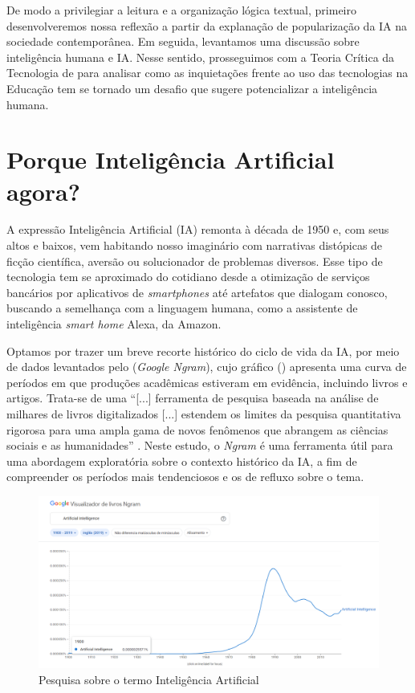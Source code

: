 \documentclass[portuguese]{textolivre}
\begin{document}
De modo a privilegiar a leitura e a organização lógica textual, primeiro desenvolveremos nossa reflexão a partir da explanação de popularização da IA na sociedade contemporânea. Em seguida, levantamos uma discussão sobre inteligência humana e IA. Nesse sentido, prosseguimos com a Teoria Crítica da Tecnologia de \textcite{feenberg2003, feenberg2004} para analisar como as inquietações frente ao uso das tecnologias na Educação tem se tornado um desafio que sugere potencializar a inteligência humana.
 

\section{Porque Inteligência Artificial agora?}

A expressão Inteligência Artificial (IA) remonta à década de 1950 \cite{santaella2023inteligencia} e, com seus altos e baixos, vem habitando nosso imaginário com narrativas distópicas de ficção científica, aversão ou solucionador de problemas diversos. Esse tipo de tecnologia tem se aproximado do cotidiano desde a otimização de serviços bancários por aplicativos de \emph{smartphones} até artefatos que dialogam conosco, buscando a semelhança com a linguagem humana, como a assistente de inteligência \emph{smart home} Alexa, da Amazon.

Optamos por trazer um breve recorte histórico do ciclo de vida da IA, por meio de dados levantados pelo \textcite{google} (\emph{Google Ngram}), cujo gráfico () apresenta uma curva de períodos em que produções acadêmicas estiveram em evidência, incluindo livros e artigos. Trata-se de uma “[...] ferramenta de pesquisa baseada na análise de milhares de livros digitalizados [...] estendem os limites da pesquisa quantitativa rigorosa para uma ampla gama de novos fenômenos que abrangem as ciências sociais e as humanidades” \cite[p. 125]{massaroo2020} . Neste estudo, o \emph{Ngram} é uma ferramenta útil para uma abordagem exploratória sobre o contexto histórico da IA, a fim de compreender os períodos mais tendenciosos e os de refluxo sobre o tema.

\begin{figure}[htbp]
\centering
\begin{minipage}{1\textwidth}
 \includegraphics[width=\textwidth]{Fig1.png}
 \caption{Pesquisa sobre o termo Inteligência Artificial}
 \label{fig1}
\end{minipage}
\end{figure}
\end{document}
